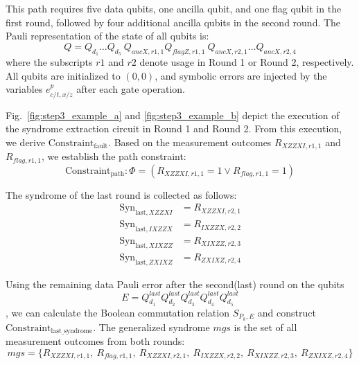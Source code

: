 \documentclass[acmsmallw,review]{acmart}
\begin{document}
This path requires five data qubits, one ancilla qubit, and one flag qubit in the first round, followed by four additional ancilla qubits in the second round. The Pauli representation of the state of all qubits is:
\begin{equation}
Q =  Q_{d_1} \dots Q_{d_5} \ Q_{ancX, r1, 1} Q_{flagZ, r1, 1} \ Q_{ancX, r2, 1} \dots Q_{ancX, r2, 4} 
\end{equation}
where the subscripts $r1$ and $r2$ denote usage in Round 1 or Round 2, respectively. All qubits are initialized to $(0,0)$, and symbolic errors are injected by the variables $e^{p}_{c/t,x/z} $ after each gate operation.

Fig.~\ref{fig:step3_example_a} and \ref{fig:step3_example_b} depict the execution of the syndrome extraction circuit in Round 1 and Round 2. From this execution, we derive $\mathrm{Constraint_\mathrm{fault}}$. Based on the measurement outcomes $R_{XZZXI, r1,1}$ and $R_{flag,r1,1}$, we establish the path constraint:
\begin{equation}
\mathrm{Constraint}_\mathrm{path}: \Phi  = (R_{XZZXI, r1,1} = 1 \lor R_{flag,r1,1} = 1)
\end{equation}

The syndrome of the last round is collected as follows:
\begin{equation}
\begin{aligned}
    \mathrm{Syn}_{\mathrm{last}, XZZXI} &= R_{XZZXI, r2,1} \\
    \mathrm{Syn}_{\mathrm{last}, IXZZX} &= R_{IXZZX, r2,2} \\
    \mathrm{Syn}_{\mathrm{last}, XIXZZ} &= R_{XIXZZ, r2,3} \\
    \mathrm{Syn}_{\mathrm{last}, ZXIXZ} &= R_{ZXIXZ, r2,4} 
\end{aligned}
\end{equation}

Using the remaining data Pauli error after the second(last) round on the qubits $$E = Q^{last}_{d_1} Q^{last}_{d_2} Q^{last}_{d_3} Q^{last}_{d_4} Q^{last}_{d_5}$$, we can calculate the Boolean commutation relation $S_{P_k,E}$ and construct $\mathrm{Constraint}_{\mathrm{last\_syndrome}}$. The generalized syndrome $mgs$ is the set of all measurement outcomes from both rounds:
\begin{equation}
mgs = \{ R_{XZZXI, r1,1}, \ R_{flag,r1,1}, \ R_{XZZXI, r2,1}, \ R_{IXZZX, r2,2}, \ R_{XIXZZ, r2,3}, \ R_{ZXIXZ, r2,4}\}
\end{equation}
\end{document}
